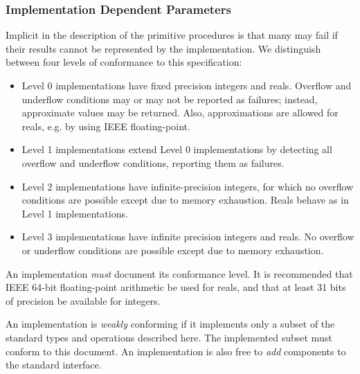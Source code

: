 %
\subsubsection{Implementation Dependent Parameters}
Implicit in the description of the primitive procedures is that many
may fail if their results cannot be represented by the implementation.
We distinguish between four levels of conformance to this specification:
\begin{itemize}
\item Level 0 implementations have fixed precision integers and reals.
Overflow and underflow conditions may or may not be reported as failures;
instead, approximate values may be returned.
Also, approximations are allowed for reals, e.g. by using IEEE floating-point.
\item Level 1 implementations extend Level 0 implementations by detecting
all overflow and underflow conditions, reporting them as failures.
\item Level 2 implementations have infinite-precision integers, for which
no overflow conditions are possible except due to memory exhaustion.
Reals behave as in Level 1 implementations.
\item Level 3 implementations have infinite precision integers and reals.
No overflow or underflow conditions are possible except due to memory exhaustion.
\end{itemize}
An implementation \emph{must} document its conformance level.
It is recommended that IEEE 64-bit floating-point arithmetic be used for reals,
and that at least 31 bits of precision be available for integers.

An implementation is \emph{weakly} conforming if it implements
only a subset of the standard types and operations described here.
The implemented subset must conform to this document.
An implementation is also free to \emph{add} components to the standard interface.
%
